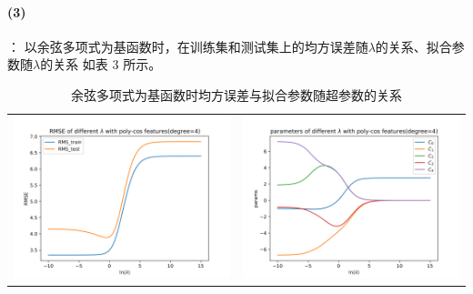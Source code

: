 \documentclass[a4paper,zihao=5,UTF8]{ctexart}
\begin{document}
    \paragraph{(3)}：
    以余弦多项式为基函数时，在训练集和测试集上的均方误差随$\lambda$的关系、拟合参数随$\lambda$的关系
    如表 3 所示。
    \begin{table}[htbp]
        \centering
        \label{poly-cos_params}
        \begin{tabular}[htbp]{cc}
            \includegraphics[scale=0.5]{RMSE_poly-cos.png} & \includegraphics[scale=0.5]{Params_poly-cos.png} \\
        \end{tabular}
        \caption{余弦多项式为基函数时均方误差与拟合参数随超参数的关系}
    \end{table}
\end{document}
